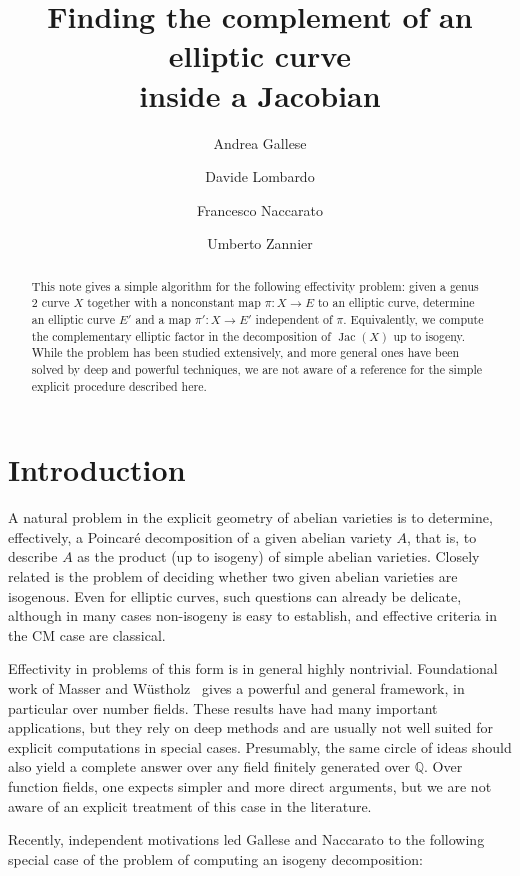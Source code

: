 \documentclass[a4paper,twoside,english]{amsart}
\title[Finding the complement of an elliptic curve inside a Jacobian]{Finding the complement of an elliptic curve \\ inside a Jacobian}
\author[Gallese]{Andrea Gallese}
\author[Lombardo]{Davide Lombardo}
\author[Naccarato]{Francesco Naccarato}
\author[Zannier]{Umberto Zannier}
\theoremstyle{plain}
\theoremstyle{definition}
\begin{document}
\begin{abstract}
This note gives a simple algorithm for the following effectivity problem: given a genus $2$ curve $X$ together with a nonconstant map $\pi:X\to E$ to an elliptic curve, determine an elliptic curve $E'$ and a map $\pi':X\to E'$ independent of $\pi$. Equivalently, we compute the complementary elliptic factor in the decomposition of $\operatorname{Jac}(X)$ up to isogeny. While the problem has been studied extensively, and more general ones have been solved by deep and powerful techniques, we are not aware of a reference for the simple explicit procedure described here.
\end{abstract}


\maketitle

\section{Introduction}    

A natural problem in the explicit geometry of abelian varieties is to determine, effectively, a Poincar\'e decomposition of a given abelian variety $A$, that is, to describe $A$ as the product (up to isogeny) of simple abelian varieties. Closely related is the problem of deciding whether two given abelian varieties are isogenous. Even for elliptic curves, such questions can already be delicate, although in many cases non-isogeny is easy to establish, and effective criteria in the CM case are classical.

Effectivity in problems of this form is in general highly nontrivial. Foundational work of {\sc Masser} and {\sc W\"ustholz}~\cite{MasserWustholz1993,MasserWustholz1995} gives a powerful and general framework, in particular over number fields. These results have had many important applications, but they rely on deep methods and are usually not well suited for explicit computations in special cases. Presumably, the same circle of ideas should also yield a complete answer over any field finitely generated over $\mathbb Q$. Over function fields, one expects simpler and more direct arguments, but we are not aware of an explicit treatment of this case in the literature.

Recently, independent motivations led {\sc Gallese} and {\sc Naccarato} to the following special case of the problem of computing an isogeny decomposition:
\end{document}
